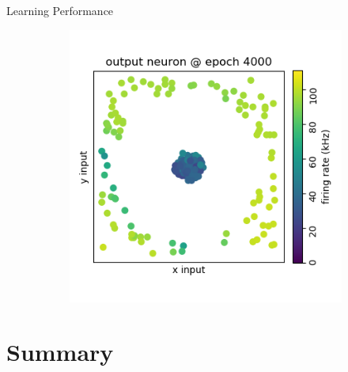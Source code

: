 \documentclass[12pt, aspectratio=169]{beamer}
\begin{document}
\begin{frame}{Learning Performance}
\begin{figure}[!htb]
\begin{figure}
            \includegraphics[scale=0.25]{output_neuron_4000.png}
            \label{fig:my_label}
        \end{figure}
    \endminipage\hfill
\end{figure}
\end{frame}

\section[Summary]{Summary}
\end{document}
